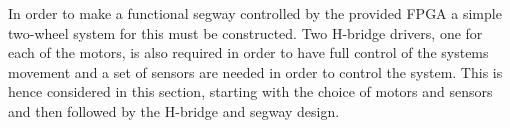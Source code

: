 In order to make a functional segway controlled by the provided FPGA a simple two-wheel system for this must be constructed.
Two H-bridge drivers, one for each of the motors, is also required in order to have full control of the systems movement and a set of sensors are needed in order to control the system.
This is hence considered in this section, starting with the choice of motors and sensors and then followed by the H-bridge and segway design.
